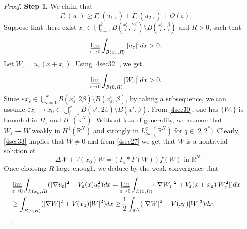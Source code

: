 \documentclass[12pt,reqno]{amsart}
\numberwithin{equation}{section}
\begin{document}
\begin{proof}
{\bf Step 1.} We claim that
\begin{equation}\label{4sec31}
\Gamma_{\varepsilon}(u_{\varepsilon})\geq
\Gamma_{\varepsilon}(u_{1,{\varepsilon}})+\Gamma_{\varepsilon}(u_{2,{\varepsilon}})+O({\varepsilon}).
\end{equation}
Suppose that there exist $x_{\varepsilon}\in \bigcup\limits_{i=1}^k
B\left(\frac{x_{\varepsilon}^i}{\varepsilon},\frac{2\beta}{\varepsilon}\right)\setminus
B\left(\frac{x_{\varepsilon}^i}{\varepsilon},\frac{\beta}{\varepsilon}\right)$
and $R>0$, such that
\begin{equation}\label{4sec32}
\varliminf\limits_{{\varepsilon}\rightarrow 0}\int_{B(x_{\varepsilon},
R)}|u_{\varepsilon}|^2dx>0.
\end{equation}
Let $W_{\varepsilon}=u_{\varepsilon}(x+x_{\varepsilon})$. Using \eqref{4sec32}
, we get
\begin{equation}\label{4sec33}
\varliminf\limits_{{\varepsilon}\rightarrow 0}\int_{B(0,
R)}|W_{\varepsilon}|^2dx>0.
\end{equation}
Since ${\varepsilon} x_{\varepsilon}\in \bigcup\limits_{i=1}^k
B\left(x_{\varepsilon}^i, 2\beta\right)\setminus B\left(x_{\varepsilon}^i,
\beta\right)$, by taking a subsequence, we can assume ${\varepsilon}
x_{\varepsilon}\rightarrow x_0\in \bigcup\limits_{i=1}^kB\left(x^i,
2\beta\right)\setminus B\left(x^i, \beta\right)$. From
\eqref{4sec30}, one has $\{W_{\varepsilon}\}$ is bounded in
$H_{\varepsilon}$ and $H^1({\mathbb R^N})$. Without loss of generality, we assume that $W_{\varepsilon}\rightharpoonup W$ weakly in $H^1({\mathbb R^N})$ and strongly in $ L_{loc}^q({\mathbb R^N})$ for $q\in[2,2^\ast)$. Clearly, \eqref{4sec33} implies that  $W\neq 0$ and from
\eqref{4sec27} we get that $W$ is a nontrivial solution of
\begin{equation}\label{4sec34}
-\Delta W+V(x_0)W=(I_{\alpha}\ast F(W))f(W)\,\, \mbox{in}\,\,{\mathbb R^N}.
\end{equation}
Once choosing $R$ large enough, we deduce by the weak convergence
that
\begin{equation}\label{4sec35}\aligned
&\varliminf\limits_{{\varepsilon}\rightarrow 0}\int_{B(x_{\varepsilon},
R)}(|{\nabla} u_{\varepsilon}|^2+V_{\varepsilon}(x)u_{\varepsilon}^2)dx=\varliminf\limits_{{\varepsilon}\rightarrow
0}\int_{B(0,
R)}(|{\nabla} W_{\varepsilon}|^2+V_{\varepsilon}(x+x_{\varepsilon})|W_{\varepsilon}^2|)dx\\
&\geq \int_{B(0, R)}(|{\nabla} W|^2+V(x_0)|W|^2)dx\geq
\frac{1}{2}\int_{{\mathbb R}^N}(|{\nabla} W|^2+V(x_0)|W|^2)dx.\endaligned

\end{equation}
\end{proof}
\end{document}

